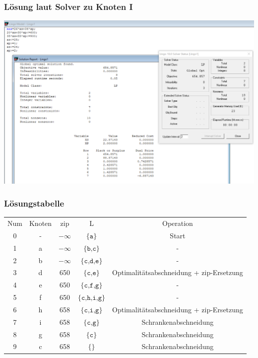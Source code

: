 \documentclass[a4paper,11pt]{article}
\begin{document}
\subsubsection*{Lösung laut Solver zu Knoten I}
\begin{centering}
	\includegraphics[width=1\linewidth]{src/blatt_5_aufgabe_2_teilaufgabe_b_knoten_i_loesung_solver.png}
\end{centering}

\subsubsection*{Lösungstabelle}
    \begin{tabular}{ c c c c c }
        Num & Knoten & zip & L & Operation \\
        0 & - & $-\infty$ & $\texttt{\{a\}}$ & Start \\
        1 & a & $-\infty$ & $\texttt{\{b,c\}}$ & - \\
        2 & b & $-\infty$ & $\texttt{\{c,d,e\}}$ & - \\
        3 & d & 650 & $\texttt{\{c,e\}}$ & Optimalitätsabschneidung + zip-Ersetzung \\
        4 & e & 650 & $\texttt{\{c,f,g\}}$ & - \\
        5 & f & 650 & $\texttt{\{c,h,i,g\}}$ & - \\
        6 & h & 658 & $\texttt{\{c,i,g\}}$  & Optimalitätsabschneidung + zip-Ersetzung \\
        7 & i & 658 & $\texttt{\{c,g\}}$ & Schrankenabschneidung \\
        8 & g & 658 & $\texttt{\{c\}}$ & Schrankenabschneidung \\
        9 & c & 658 & $\texttt{\{\}}$ & Schrankenabschneidung \\
    \end{tabular}
\end{document}

